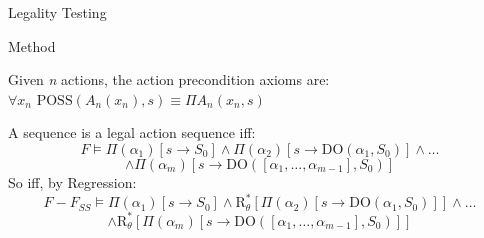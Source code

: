 \begin{frame}{Legality Testing}
    \vspace*{-0.5cm}
    \begin{block}{Method}
    \raggedright
    Given \textit{n} actions, the action precondition axioms are:
        \centering $ \forall x_n \text{ POSS}(A_n(x_n), s) \equiv \Pi A_n(x_n, s) $ \\ 
    \raggedright
    A sequence is a legal action sequence iff:     
        \[ \textit{F} \models \Pi(\alpha_1)[s \rightarrow S_0] \land \Pi(\alpha_2)[s \rightarrow \text{DO}(\alpha_1, S_0)] \land \ldots \]
        \[ \land \Pi(\alpha_m)[s \rightarrow \text{DO}([\alpha_1, \ldots, \alpha_{m-1}], S_0)] \]
    So iff, by Regression:
        \[ \textit{F} - \textit{F}_{\textit{SS}} \models \Pi(\alpha_1)[s \rightarrow S_0] \land \text{R}^*_{\theta}[\Pi(\alpha_2)[s \rightarrow \text{DO}(\alpha_1, S_0)]] \land \ldots \]
        \[ \land \text{R}^*_{\theta}[\Pi(\alpha_m)[s \rightarrow \text{DO}([\alpha_1, \ldots, \alpha_{m-1}], S_0)]] \]
    \end{block}
\end{frame}